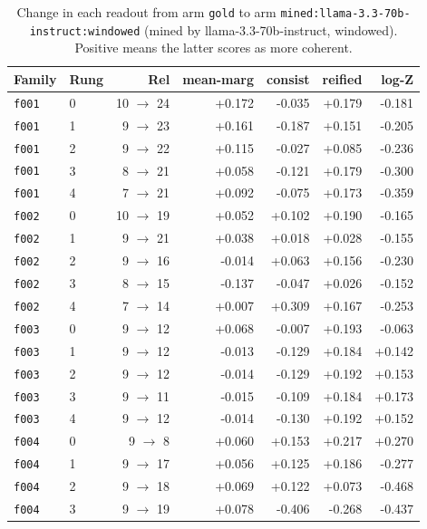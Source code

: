\documentclass[11pt]{article}
\begin{document}
\begin{table}[htbp]
\centering
\small
\caption{Change in each readout from arm \texttt{gold} to arm \texttt{mined:llama-3.3-70b-instruct:windowed} (mined by llama-3.3-70b-instruct, windowed). Positive means the latter scores as more coherent.}
\label{tab:arm-delta-gold-mined-llama-3-3-70b-instruct-windowed}
\begin{tabular}{llrrrrr}
\toprule
Family & Rung & Rel & \textbf{mean-marg} & \textbf{consist} & \textbf{reified} & \textbf{log-Z} \\
\midrule
\texttt{f001} & 0 & 10 $\to$ 24 & +0.172 & -0.035 & +0.179 & -0.181 \\
\texttt{f001} & 1 & 9 $\to$ 23 & +0.161 & -0.187 & +0.151 & -0.205 \\
\texttt{f001} & 2 & 9 $\to$ 22 & +0.115 & -0.027 & +0.085 & -0.236 \\
\texttt{f001} & 3 & 8 $\to$ 21 & +0.058 & -0.121 & +0.179 & -0.300 \\
\texttt{f001} & 4 & 7 $\to$ 21 & +0.092 & -0.075 & +0.173 & -0.359 \\
\texttt{f002} & 0 & 10 $\to$ 19 & +0.052 & +0.102 & +0.190 & -0.165 \\
\texttt{f002} & 1 & 9 $\to$ 21 & +0.038 & +0.018 & +0.028 & -0.155 \\
\texttt{f002} & 2 & 9 $\to$ 16 & -0.014 & +0.063 & +0.156 & -0.230 \\
\texttt{f002} & 3 & 8 $\to$ 15 & -0.137 & -0.047 & +0.026 & -0.152 \\
\texttt{f002} & 4 & 7 $\to$ 14 & +0.007 & +0.309 & +0.167 & -0.253 \\
\texttt{f003} & 0 & 9 $\to$ 12 & +0.068 & -0.007 & +0.193 & -0.063 \\
\texttt{f003} & 1 & 9 $\to$ 12 & -0.013 & -0.129 & +0.184 & +0.142 \\
\texttt{f003} & 2 & 9 $\to$ 12 & -0.014 & -0.129 & +0.192 & +0.153 \\
\texttt{f003} & 3 & 9 $\to$ 11 & -0.015 & -0.109 & +0.184 & +0.173 \\
\texttt{f003} & 4 & 9 $\to$ 12 & -0.014 & -0.130 & +0.192 & +0.152 \\
\texttt{f004} & 0 & 9 $\to$ 8 & +0.060 & +0.153 & +0.217 & +0.270 \\
\texttt{f004} & 1 & 9 $\to$ 17 & +0.056 & +0.125 & +0.186 & -0.277 \\
\texttt{f004} & 2 & 9 $\to$ 18 & +0.069 & +0.122 & +0.073 & -0.468 \\
\texttt{f004} & 3 & 9 $\to$ 19 & +0.078 & -0.406 & -0.268 & -0.437 \\

\end{tabular}
\end{table}
\end{document}
